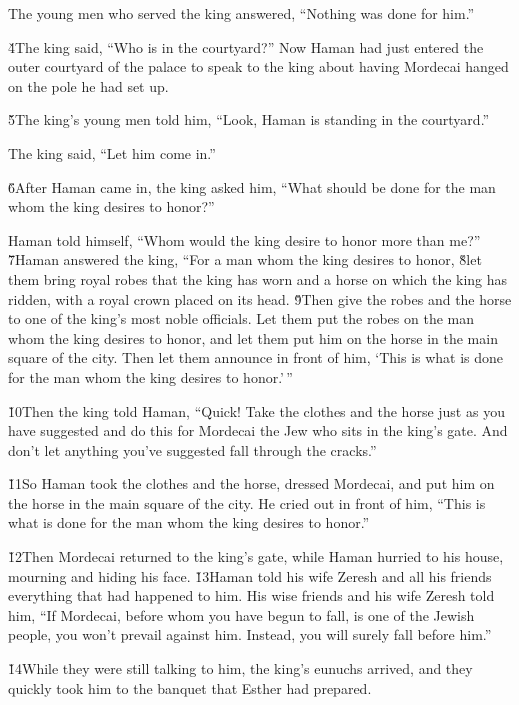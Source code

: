 The young men who served the king answered, ``Nothing was done for him.''

\v{4}The king said, ``Who is in the courtyard?'' Now Haman had just entered the outer courtyard of the palace to speak to the king about having Mordecai hanged on the pole he had set up.

\v{5}The king's young men told him, ``Look, Haman is standing in the courtyard.''

The king said, ``Let him come in.''

\v{6}After Haman came in, the king asked him, ``What should be done for the man whom the king desires to honor?''

Haman told himself, ``Whom would the king desire to honor more than me?'' \v{7}Haman answered the king, ``For a man whom the king desires to honor, \v{8}let them bring royal robes that the king has worn and a horse on which the king has ridden, with a royal crown placed on its head. \v{9}Then give the robes and the horse to one of the king's most noble officials. Let them put the robes on the man whom the king desires to honor, and let them put him on the horse in the main square of the city. Then let them announce in front of him, `This is what is done for the man whom the king desires to honor.'\,''

\v{10}Then the king told Haman, ``Quick! Take the clothes and the horse just as you have suggested and do this for Mordecai the Jew who sits in the king's gate. And don't let anything you've suggested fall through the cracks.''

\v{11}So Haman took the clothes and the horse, dressed Mordecai, and put him on the horse in the main square of the city. He cried out in front of him, ``This is what is done for the man whom the king desires to honor.''

\v{12}Then Mordecai returned to the king's gate, while Haman hurried to his house, mourning and hiding his face. \v{13}Haman told his wife Zeresh and all his friends everything that had happened to him. His wise friends and his wife Zeresh told him, ``If Mordecai, before whom you have begun to fall, is one of the Jewish people, you won't prevail against him. Instead, you will surely fall before him.''

\v{14}While they were still talking to him, the king's eunuchs arrived, and they quickly took him to the banquet that Esther had prepared.

